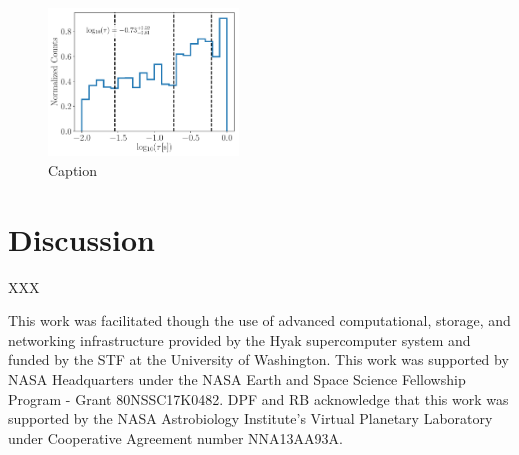 \documentclass[twocolumn]{aastex61}
\begin{document}
\begin{figure}
	\includegraphics[width=0.45\textwidth]{../Plots/tauLurie.pdf}
   \caption{Caption}%
    \label{fig:tauLurie}%
\end{figure}

\section{Discussion} \label{sec:discussion}

XXX

\acknowledgments
This work was facilitated though the use of advanced computational, storage, and networking infrastructure provided by the Hyak supercomputer system and funded by the STF at the University of Washington. This work was supported by NASA Headquarters under the NASA Earth and Space Science Fellowship Program - Grant 80NSSC17K0482.  DPF and RB acknowledge that this work was supported by the NASA Astrobiology Institute's Virtual Planetary Laboratory under Cooperative Agreement number NNA13AA93A. 



\end{document}

